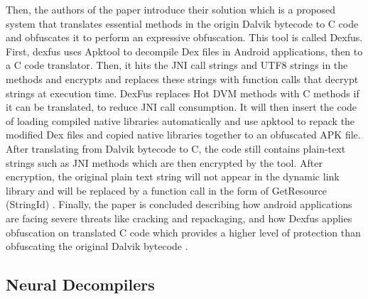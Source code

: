 \documentclass{article}
\begin{document}
Then, the authors of the paper introduce their solution which is a proposed system that translates essential methods in the origin Dalvik bytecode to C code and obfuscates it to perform an expressive obfuscation. This tool is called Dexfus. First, dexfus uses Apktool to decompile Dex files in Android applications, then to a C code translator. Then, it hits the JNI call strings and UTF8 strings in the methods and encrypts and replaces these strings with function calls that decrypt strings at execution time. DexFus replaces Hot DVM methods with C methods if it can be translated, to reduce JNI call consumption. It will then insert the code of loading compiled native libraries automatically and use apktool to repack the modified Dex files and copied native libraries together to an obfuscated APK file. After translating from Dalvik bytecode to C, the code still contains plain-text strings such as JNI methods which are then encrypted by the tool. After encryption, the original plain text string will not appear in the dynamic link library and will be replaced by a function call in the form of GetResource (StringId) \cite{naitian_dexfus_2020}.
Finally, the paper is concluded describing how android applications are facing severe threats like cracking and repackaging, and how Dexfus applies obfuscation on translated C code which provides a higher level of protection than obfuscating the original Dalvik bytecode \cite{naitian_dexfus_2020}.

\subsection{Neural Decompilers}
\end{document}
